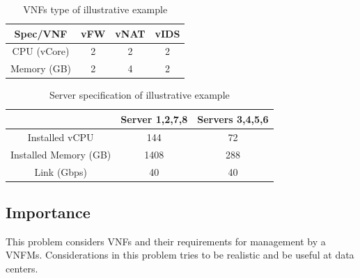 \begin{table}
    \centering
    \caption{VNFs type of illustrative example}
    \begin{tabular}{|c|c|c|c|}
        \hline
        Spec/VNF & vFW & vNAT & vIDS \\
        \hline
        CPU (vCore) & 2 & 2 & 2 \\
        \hline
        Memory (GB) & 2 & 4 & 2 \\
        \hline
    \end{tabular}
    \label{tbl:example-vnf-types}
\end{table}

\begin{table}
    \centering
    \caption{Server specification of illustrative example}
    \begin{tabular}{|c|c|c|}
        \hline
        & Server 1,2,7,8 & Servers 3,4,5,6 \\
        \hline
        Installed vCPU & 144 & 72 \\
        \hline
        Installed Memory (GB) & 1408 & 288 \\
        \hline
        Link (Gbps) & 40 & 40 \\
        \hline
    \end{tabular}
    \label{tbl:example-server-spec}
\end{table}

\subsection{Importance}
\par
This problem considers VNFs and their requirements for management by a VNFMs.
Considerations in this problem tries to be realistic and be useful at data centers.